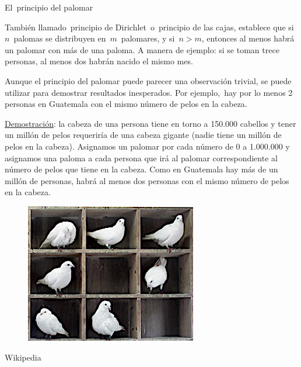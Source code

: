 \begin{myexampleblock} {El principio del palomar}
\begin{small}
También llamado principio de Dirichlet o principio de las cajas, establece que si $n$ palomas se distribuyen en $m$ palomares, y si $n > m$, entonces al menos habrá un palomar con más de una paloma. A manera de ejemplo: si se toman trece personas, al menos dos habrán nacido el mismo mes.

\vspace{2mm} Aunque el principio del palomar puede parecer una observación trivial, se puede utilizar para demostrar resultados inesperados. Por ejemplo, hay por lo menos 2 personas en Guatemala con el mismo número de pelos en la cabeza. 
\end{small}
\begin{multicols}{2}
\begin{small}
	\underline{Demostración}: la cabeza de una persona tiene en torno a 150.000 cabellos y tener un millón de pelos requeriría de una cabeza gigante (nadie tiene un millón de pelos en la cabeza). Asignamos un palomar por cada número de 0 a 1.000.000 y asignamos una paloma a cada persona que irá al palomar correspondiente al número de pelos que tiene en la cabeza. Como en Guatemala hay más de un millón de personas, habrá al menos dos personas con el mismo número de pelos en la cabeza. 
\begin{figure}[H]
	\centering
	\includegraphics[width=.45\textwidth]{imagenes/apendices/app14.png}
	\end{figure}
\end{small}
\end{multicols}
\begin{flushright}\begin{scriptsize}\textcolor{gris}{Wikipedia}\end{scriptsize}\end{flushright}
\end{myexampleblock}



